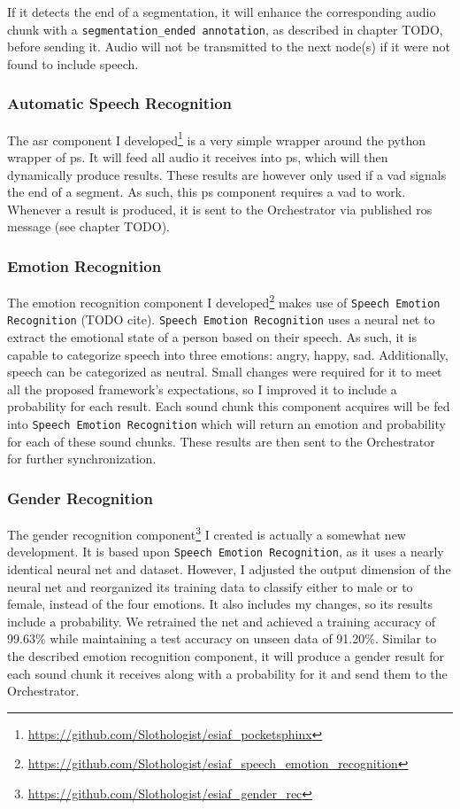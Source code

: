 If it detects the end of a segmentation, it will enhance the corresponding audio chunk with a \texttt{segmentation\_ended annotation}, as described in chapter TODO, before sending it.
Audio will not be transmitted to the next node(s) if it were not found to include speech.

\subsubsection{Automatic Speech Recognition}
\label{main:components:ps}
The \gls{asr} component I developed\footnote{\url{https://github.com/Slothologist/esiaf_pocketsphinx}} is a very simple wrapper around the python wrapper of \gls{ps}.
It will feed all audio it receives into \gls{ps}, which will then dynamically produce results.
These results are however only used if a \gls{vad} signals the end of a segment.
As such, this \gls{ps} component requires a \gls{vad} to work.
Whenever a result is produced, it is sent to the Orchestrator via published \gls{ros} message (see chapter TODO).

\subsubsection{Emotion Recognition}
\label{main:components:emotion}
The emotion recognition component I developed\footnote{\url{https://github.com/Slothologist/esiaf_speech_emotion_recognition}} makes use of \texttt{Speech Emotion Recognition} (TODO cite).
\texttt{Speech Emotion Recognition} uses a neural net to extract the emotional state of a person based on their speech.
As such, it is capable to categorize speech into three emotions: angry, happy, sad.
Additionally, speech can be categorized as neutral.
Small changes were required for it to meet all the proposed framework's expectations, so I improved it to include a probability for each result. %
Each sound chunk this component acquires will be fed into \texttt{Speech Emotion Recognition} which will return an emotion and probability for each of these sound chunks.
These results are then sent to the Orchestrator for further synchronization.

\subsubsection{Gender Recognition}
\label{main:components:gender}
The gender recognition component\footnote{\url{https://github.com/Slothologist/esiaf_gender_rec}} I created is actually a somewhat new development.
It is based upon \texttt{Speech Emotion Recognition}, as it uses a nearly identical neural net and dataset.
However, I adjusted the output dimension of the neural net and reorganized its training data to classify either to male or to female, instead of the four emotions.
It also includes my changes, so its results include a probability.
We retrained the net and achieved a training accuracy of 99.63\% while maintaining a test accuracy on unseen data of 91.20\%.
Similar to the described emotion recognition component, it will produce a gender result for each sound chunk it receives along with a probability for it and send them to the Orchestrator.

